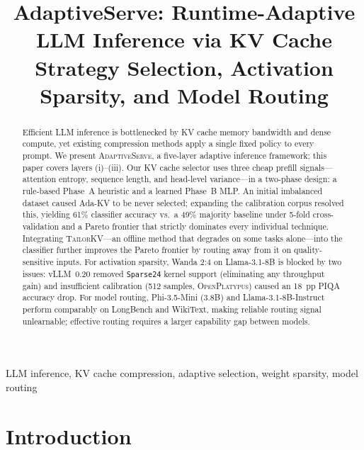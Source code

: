 \documentclass[conference]{IEEEtran}
\title{AdaptiveServe: Runtime-Adaptive LLM Inference via KV Cache Strategy
       Selection, Activation Sparsity, and Model Routing}
\author{
  \IEEEauthorblockN{Youssef Araby}
  \IEEEauthorblockA{\textit{[Department / Lab]}\\
    [Institution]\\
    [City, Country]\\
    youssef@[institution].edu}
  \and
  \IEEEauthorblockN{Rodaina [LastName]}
  \IEEEauthorblockA{\textit{[Department / Lab]}\\
    [Institution]\\
    [City, Country]\\
    rodaina@[institution].edu}
}
\begin{document}
\maketitle

\begin{abstract}
Efficient LLM inference is bottlenecked by KV cache memory bandwidth and dense
compute, yet existing compression methods apply a single fixed policy to every
prompt.
We present \textsc{AdaptiveServe}, a five-layer adaptive inference framework;
this paper covers layers (i)--(iii).
Our KV cache selector uses three cheap prefill signals---attention entropy,
sequence length, and head-level variance---in a two-phase design: a
rule-based Phase~A heuristic and a learned Phase~B MLP.
An initial imbalanced dataset caused Ada-KV to be never selected; expanding
the calibration corpus resolved this, yielding 61\% classifier accuracy vs.\
a 49\% majority baseline under 5-fold cross-validation and a Pareto frontier
that strictly dominates every individual technique.
Integrating \textsc{TailorKV}---an offline method that degrades on some tasks
alone---into the classifier further improves the Pareto frontier by routing
away from it on quality-sensitive inputs.
For activation sparsity, Wanda 2:4 on Llama-3.1-8B is blocked by two issues:
vLLM~0.20 removed \texttt{Sparse24} kernel support (eliminating any
throughput gain) and insufficient calibration (512 samples,
\textsc{OpenPlatypus}) caused an 18~pp PIQA accuracy drop.
For model routing, Phi-3.5-Mini (3.8B) and Llama-3.1-8B-Instruct perform
comparably on LongBench and WikiText, making reliable routing signal
unlearnable; effective routing requires a larger capability gap between models.
\end{abstract}

\begin{IEEEkeywords}
LLM inference, KV cache compression, adaptive selection, weight sparsity,
model routing
\end{IEEEkeywords}

\section{Introduction}
\label{sec:introduction}
\end{document}
